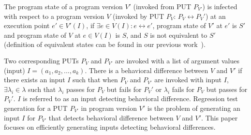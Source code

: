 \vspace{-0.5cm}
{
The program state  of a program version $V'$ (invoked from PUT $P_{V'}$) is infected with respect to a 
program version $V$ (invoked by PUT $P_{V}$: $P_V \leftrightarrow P_V'$) 
at an execution point $e'\in V'(I)$, if 
$\exists e \in V(I): e \leftrightarrow e' $, program state of $V'$ at $e'$ is $S'$ and program state of $V$ at
$e \in V(I)$ is $S$, and $S$ is not equivalent to $S'$ (definition of equivalent states can be found in our previous work~\cite{xie04:rostra}).
}

\vspace{-0.5cm}
{
Two corresponding PUTs $P_V$ and $P_{V'}$ are invoked with a list of argument values (input) $I =(a_1, a_2,..., a_k)$.
There is a behavioral difference between $V$ and $V'$ if there exists an input $I$ such that 
when $P_V$ and $P_{V'}$ are invoked with input $I$, $\exists \lambda_i \in \lambda$ such that $\lambda_i$ passes
for $P_V$ but fails for $P_V'$ or $\lambda_i$ fails
for $P_V$ but passes for $P_V'$. $I$ is referred to as an input detecting behavioral difference.
}
\vspace{-0.5cm}
{
Regression test generation for a PUT $P_{V'}$ in program version $V'$
is the problem of generating an input $I$ for $P_{V'}$  
that detects behavioral difference 
between $V$ and $V'$.
This paper focuses on efficiently generating inputs detecting behavioral differences.
}
